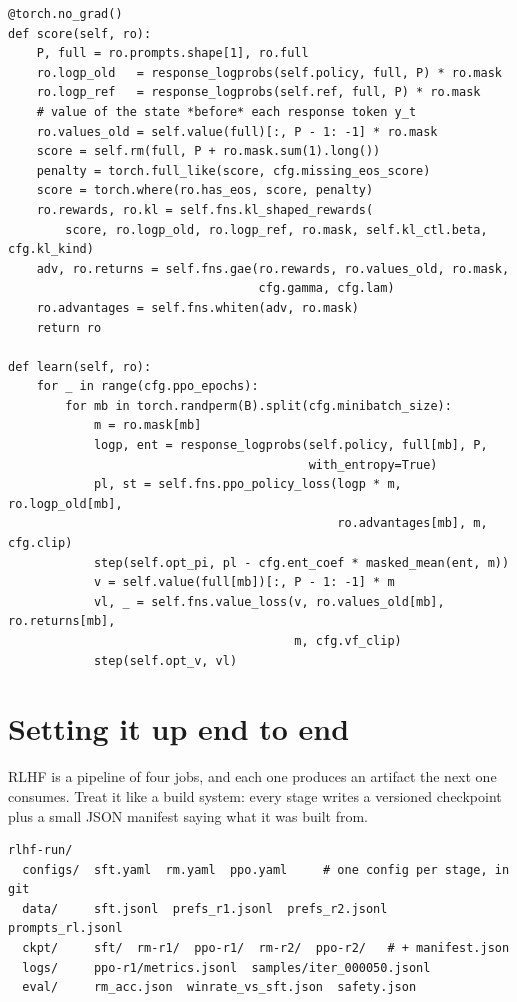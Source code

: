 \begin{lstlisting}[caption={The trainer's phases (\ident{llmsys/rlhf/ppo.py}, abridged). The losses come from an injectable module \code{fns}, so Lab 25 runs the whole system on your own implementations.},label={lst:rlhf:trainer}]
@torch.no_grad()
def score(self, ro):
    P, full = ro.prompts.shape[1], ro.full
    ro.logp_old   = response_logprobs(self.policy, full, P) * ro.mask
    ro.logp_ref   = response_logprobs(self.ref, full, P) * ro.mask
    # value of the state *before* each response token y_t
    ro.values_old = self.value(full)[:, P - 1: -1] * ro.mask
    score = self.rm(full, P + ro.mask.sum(1).long())
    penalty = torch.full_like(score, cfg.missing_eos_score)
    score = torch.where(ro.has_eos, score, penalty)
    ro.rewards, ro.kl = self.fns.kl_shaped_rewards(
        score, ro.logp_old, ro.logp_ref, ro.mask, self.kl_ctl.beta, cfg.kl_kind)
    adv, ro.returns = self.fns.gae(ro.rewards, ro.values_old, ro.mask,
                                   cfg.gamma, cfg.lam)
    ro.advantages = self.fns.whiten(adv, ro.mask)
    return ro

def learn(self, ro):
    for _ in range(cfg.ppo_epochs):
        for mb in torch.randperm(B).split(cfg.minibatch_size):
            m = ro.mask[mb]
            logp, ent = response_logprobs(self.policy, full[mb], P,
                                          with_entropy=True)
            pl, st = self.fns.ppo_policy_loss(logp * m, ro.logp_old[mb],
                                              ro.advantages[mb], m, cfg.clip)
            step(self.opt_pi, pl - cfg.ent_coef * masked_mean(ent, m))
            v = self.value(full[mb])[:, P - 1: -1] * m
            vl, _ = self.fns.value_loss(v, ro.values_old[mb], ro.returns[mb],
                                        m, cfg.vf_clip)
            step(self.opt_v, vl)
\end{lstlisting}

\section{Setting it up end to end}\label{sec:rlhf:setup}

RLHF is a pipeline of four jobs, and each one produces an artifact the next one consumes. Treat it
like a build system: every stage writes a versioned checkpoint plus a small JSON manifest saying
what it was built from.

\begin{lstlisting}[style=plain,caption={A project layout for an RLHF run.},label={lst:rlhf:layout}]
rlhf-run/
  configs/  sft.yaml  rm.yaml  ppo.yaml     # one config per stage, in git
  data/     sft.jsonl  prefs_r1.jsonl  prefs_r2.jsonl  prompts_rl.jsonl
  ckpt/     sft/  rm-r1/  ppo-r1/  rm-r2/  ppo-r2/   # + manifest.json
  logs/     ppo-r1/metrics.jsonl  samples/iter_000050.jsonl
  eval/     rm_acc.json  winrate_vs_sft.json  safety.json
\end{lstlisting}

